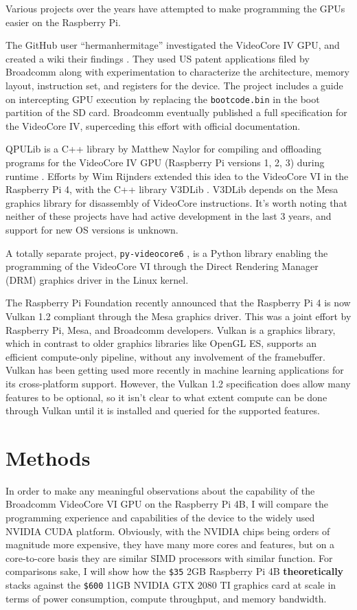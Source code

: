 \documentclass[12pt]{article}
\begin{document}
Various projects over the years have attempted to make programming the GPUs easier on the Raspberry Pi. 

The GitHub user ``hermanhermitage'' investigated the VideoCore IV GPU, and created a wiki their findings \cite{videocoreiv_herman}. They used US patent applications filed by Broadcomm along with experimentation to characterize the architecture, memory layout, instruction set, and registers for the device. The project includes a guide on intercepting GPU execution by replacing the \verb|bootcode.bin| in the boot partition of the SD card. Broadcomm eventually published a full specification for the VideoCore IV, superceding this effort with official documentation.

QPULib is a C++ library by Matthew Naylor for compiling and offloading programs for the VideoCore IV GPU (Raspberry Pi versions 1, 2, 3) during runtime \cite{QPULib}. Efforts by Wim Rijnders extended this idea to the VideoCore VI in the Raspberry Pi 4, with the C++ library V3DLib \cite{rijnders2021v3dlib}. V3DLib depends on the Mesa graphics library for disassembly of VideoCore instructions. It's worth noting that neither of these projects have had active development in the last 3 years, and support for new OS versions is unknown. 

A totally separate project, \verb|py-videocore6| \cite{pyvideocore6}, is a Python library enabling the programming of the VideoCore VI through the Direct Rendering Manager (DRM) graphics driver in the Linux kernel.

The Raspberry Pi Foundation recently announced that the Raspberry Pi 4 is now Vulkan 1.2 compliant through the Mesa graphics driver. This was a joint effort by Raspberry Pi, Mesa, and Broadcomm developers. Vulkan is a graphics library, which in contrast to older graphics libraries like OpenGL ES, supports an efficient compute-only pipeline, without any involvement of the framebuffer. Vulkan has been getting used more recently in machine learning applications for its cross-platform support. However, the Vulkan 1.2 specification does allow many features to be optional, so it isn't clear to what extent compute can be done through Vulkan until it is installed and queried for the supported features.

\section{Methods}\label{sec:methods}
In order to make any meaningful observations about the capability of the Broadcomm VideoCore VI GPU on the Raspberry Pi 4B, I will compare the programming experience and capabilities of the device to the widely used NVIDIA CUDA platform. Obviously, with the NVIDIA chips being orders of magnitude more expensive, they have many more cores and features, but on a core-to-core basis they are similar SIMD processors with similar function. For comparisons sake, I will show how the \verb|$35| 2GB Raspberry Pi 4B \textbf{theoretically} stacks against the \verb|$600| 11GB NVIDIA GTX 2080 TI graphics card at scale in terms of power consumption, compute throughput, and memory bandwidth.
\end{document}
